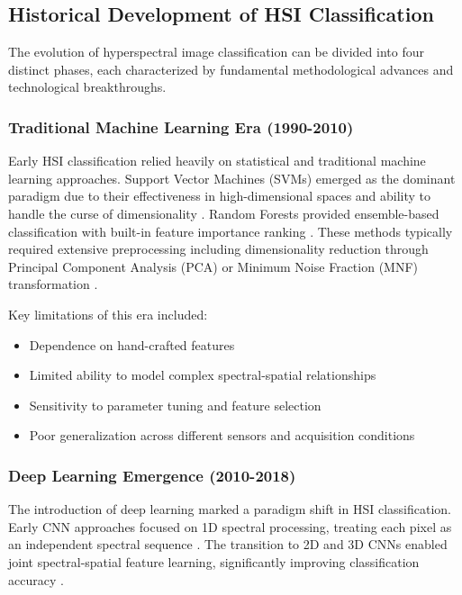 \documentclass[journal]{IEEEtran}
\begin{document}
\subsection{Historical Development of HSI Classification}

The evolution of hyperspectral image classification can be divided into four distinct phases, each characterized by fundamental methodological advances and technological breakthroughs.

\subsubsection{Traditional Machine Learning Era (1990-2010)}

Early HSI classification relied heavily on statistical and traditional machine learning approaches. Support Vector Machines (SVMs) emerged as the dominant paradigm due to their effectiveness in high-dimensional spaces and ability to handle the curse of dimensionality \cite{melgani2004classification}. Random Forests provided ensemble-based classification with built-in feature importance ranking \cite{gislason2006random}. These methods typically required extensive preprocessing including dimensionality reduction through Principal Component Analysis (PCA) or Minimum Noise Fraction (MNF) transformation \cite{green1988transformation}.

Key limitations of this era included:
\begin{itemize}
\item Dependence on hand-crafted features
\item Limited ability to model complex spectral-spatial relationships
\item Sensitivity to parameter tuning and feature selection
\item Poor generalization across different sensors and acquisition conditions
\end{itemize}

\subsubsection{Deep Learning Emergence (2010-2018)}

The introduction of deep learning marked a paradigm shift in HSI classification. Early CNN approaches focused on 1D spectral processing, treating each pixel as an independent spectral sequence \cite{chen2019deep}. The transition to 2D and 3D CNNs enabled joint spectral-spatial feature learning, significantly improving classification accuracy \cite{zhong2019spectral}.
\end{document}
